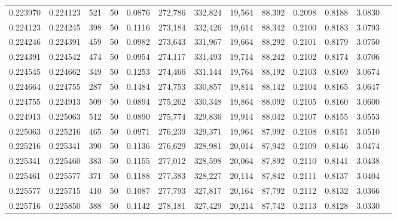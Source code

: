 \begin{tabular}{rrrrrrrrrrrrr}
0.223970 & 0.224123 &   521 &  50 &                                     0.0876 & 272,786 & 332,824 &  19,564 &  88,392 & 0.2098 & 0.8188 & 3.0830 \\
0.224123 & 0.224245 &   398 &  50 &                                     0.1116 & 273,184 & 332,426 &  19,614 &  88,342 & 0.2100 & 0.8183 & 3.0793 \\
0.224246 & 0.224391 &   459 &  50 &                                     0.0982 & 273,643 & 331,967 &  19,664 &  88,292 & 0.2101 & 0.8179 & 3.0750 \\
0.224391 & 0.224542 &   474 &  50 &                                     0.0954 & 274,117 & 331,493 &  19,714 &  88,242 & 0.2102 & 0.8174 & 3.0706 \\
0.224545 & 0.224662 &   349 &  50 &                                     0.1253 & 274,466 & 331,144 &  19,764 &  88,192 & 0.2103 & 0.8169 & 3.0674 \\
0.224664 & 0.224755 &   287 &  50 &                                     0.1484 & 274,753 & 330,857 &  19,814 &  88,142 & 0.2104 & 0.8165 & 3.0647 \\
0.224755 & 0.224913 &   509 &  50 &                                     0.0894 & 275,262 & 330,348 &  19,864 &  88,092 & 0.2105 & 0.8160 & 3.0600 \\
0.224913 & 0.225063 &   512 &  50 &                                     0.0890 & 275,774 & 329,836 &  19,914 &  88,042 & 0.2107 & 0.8155 & 3.0553 \\
0.225063 & 0.225216 &   465 &  50 &                                     0.0971 & 276,239 & 329,371 &  19,964 &  87,992 & 0.2108 & 0.8151 & 3.0510 \\
0.225216 & 0.225341 &   390 &  50 &                                     0.1136 & 276,629 & 328,981 &  20,014 &  87,942 & 0.2109 & 0.8146 & 3.0474 \\
0.225341 & 0.225460 &   383 &  50 &                                     0.1155 & 277,012 & 328,598 &  20,064 &  87,892 & 0.2110 & 0.8141 & 3.0438 \\
0.225461 & 0.225577 &   371 &  50 &                                     0.1188 & 277,383 & 328,227 &  20,114 &  87,842 & 0.2111 & 0.8137 & 3.0404 \\
0.225577 & 0.225715 &   410 &  50 &                                     0.1087 & 277,793 & 327,817 &  20,164 &  87,792 & 0.2112 & 0.8132 & 3.0366 \\
0.225716 & 0.225850 &   388 &  50 &                                     0.1142 & 278,181 & 327,429 &  20,214 &  87,742 & 0.2113 & 0.8128 & 3.0330 \\

\end{tabular}
